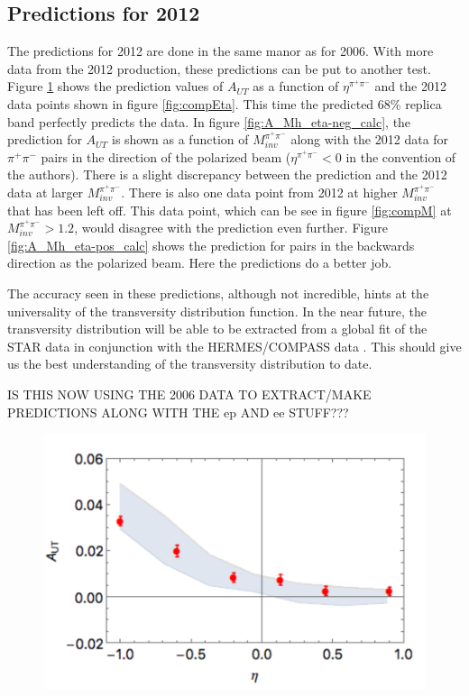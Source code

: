 \documentclass[abstract = on,listof=totoc, bibliography=totoc]{scrreprt}
\newcommand{\mpair}{M_{inv}^{\pi^+\pi^-}}
\newcommand{\etapair}{\eta^{\pi^+\pi^-}}
\newcommand{\pip}{\pi^+}
\newcommand{\pim}{\pi^-}
\newcommand{\pair}{$\pip\pim$ }
\begin{document}
\FloatBarrier
\subsection{Predictions for 2012}

The predictions for 2012 are done in the same manor as for 2006. With more data from the 2012 production, these predictions can be put to another test. Figure \ref{fig:A_eta_calc} shows the prediction values of $A_{UT}$ as a function of $\etapair$ and the 2012 data points shown in figure \ref{fig:compEta}. This time the predicted 68\% replica band perfectly predicts the data. In figure \ref{fig:A_Mh_eta-neg_calc}, the prediction for $A_{UT}$ is shown as a function of $\mpair$ along with the 2012 data for \pair pairs in the direction of the polarized beam ($\etapair < 0$ in the convention of the authors). There is a slight discrepancy between the prediction and the 2012 data at larger $\mpair$. There is also one data point from 2012 at higher $\mpair$ that has been left off. This data point, which can be see in figure \ref{fig:compM} at $\mpair > 1.2$, would disagree with the prediction even further. Figure \ref{fig:A_Mh_eta-pos_calc} shows the prediction for pairs in the backwards direction as the polarized beam. Here the predictions do a better job.    

The accuracy seen in these predictions, although not incredible, hints at the universality of the transversity distribution function. In the near future, the transversity distribution will be able to be extracted from a global fit of the STAR data in conjunction with the HERMES/COMPASS data \cite{univTrans}. This should give us the best understanding of the transversity distribution to date.  


IS THIS NOW USING THE 2006 DATA TO EXTRACT/MAKE PREDICTIONS ALONG WITH THE ep AND ee STUFF???


\begin{figure}
\begin{center}
\includegraphics[width = .6\textwidth]{A_eta}
\caption[]{}
\label{fig:A_eta_calc}
\end{center}
\end{figure}
\end{document}
